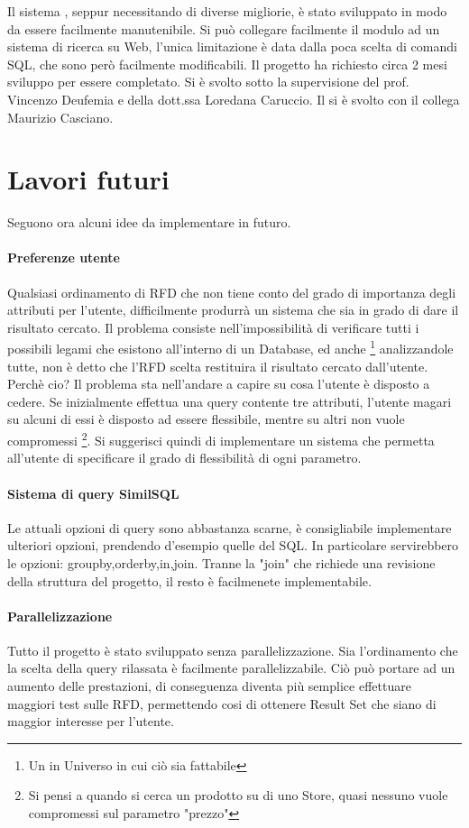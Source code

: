 Il sistema , seppur necessitando di diverse migliorie, è stato sviluppato in modo da essere facilmente manutenibile. 
Si può collegare facilmente il modulo ad un sistema di ricerca su Web, l'unica limitazione è data dalla poca scelta di comandi SQL, che sono però facilmente modificabili.
Il progetto ha richiesto circa 2 mesi sviluppo per essere completato. Si è svolto sotto la supervisione del prof. Vincenzo Deufemia e della dott.ssa Loredana Caruccio. Il si è svolto con il collega Maurizio Casciano.

\section{Lavori futuri}
Seguono ora alcuni idee da implementare in futuro.
\paragraph{Preferenze utente}
Qualsiasi ordinamento di RFD che non tiene conto del grado di importanza degli attributi per l'utente, difficilmente produrrà un sistema che sia in grado di dare il risultato cercato.
Il problema consiste nell'impossibilità di verificare tutti i possibili legami che esistono all'interno di un Database, ed anche \footnote{Un in Universo in cui ciò sia fattabile} analizzandole tutte, non è detto che l'RFD scelta restituira il risultato cercato dall'utente. Perchè cio?
Il problema sta nell'andare a capire su cosa l'utente è disposto a cedere. Se inizialmente effettua una query contente tre attributi, l'utente magari su alcuni di essi è disposto ad essere flessibile, mentre su altri non vuole compromessi \footnote{Si pensi a quando si cerca un prodotto su di uno Store, quasi nessuno vuole compromessi sul parametro "prezzo"}.
Si suggerisci quindi di implementare un sistema che permetta all'utente di specificare il grado di flessibilità di ogni parametro.
\paragraph{Sistema di query SimilSQL}
Le attuali opzioni di query sono abbastanza scarne, è consigliabile implementare ulteriori opzioni, prendendo d'esempio quelle del SQL. In particolare servirebbero le opzioni: groupby,orderby,in,join.
Tranne la "join" che richiede una revisione della struttura del progetto, il resto è facilmenete implementabile.
\paragraph{Parallelizzazione}
Tutto il progetto è stato sviluppato senza parallelizzazione. Sia l'ordinamento che la scelta della query rilassata è facilmente parallelizzabile. Ciò può portare ad un aumento delle prestazioni, di conseguenza diventa più semplice effettuare maggiori test sulle RFD, permettendo cosi di ottenere Result Set che siano di maggior interesse per l'utente.